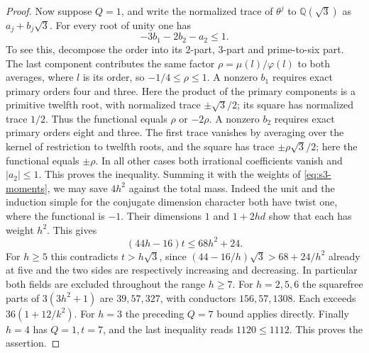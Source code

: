 \documentclass[11pt,a4paper]{article}
\numberwithin{equation}{section}
\begin{document}
\begin{proof}
Now suppose $Q=1$, and write the normalized trace of $\theta^j$
to $\mathbb Q(\sqrt3)$ as $a_j+b_j\sqrt3$.
For every root of unity one has
\[
 -3b_1-2b_2-a_2\le1.
\]
To see this, decompose the order into its $2$-part, $3$-part and
prime-to-six part. The last component contributes the same factor
$\rho=\mu(l)/\varphi(l)$ to both averages, where $l$ is its order,
so $-1/4\le\rho\le1$. A nonzero $b_1$ requires exact primary
orders four and three. Here the product of the primary components
is a primitive twelfth root, with normalized trace $\pm\sqrt3/2$;
its square has normalized trace $1/2$. Thus the functional equals
$\rho$ or $-2\rho$. A nonzero $b_2$ requires exact primary orders
eight and three. The first trace vanishes by averaging over the
kernel of restriction to twelfth roots, and the square has trace
$\pm\rho\sqrt3/2$; here the functional equals $\pm\rho$.
In all other cases both irrational coefficients vanish and
$|a_2|\le1$. This proves the inequality. Summing it with the weights
of \eqref{eq:s3-moments}, we may save $4h^2$ against the total mass. Indeed the unit and the induction simple for the conjugate dimension character both have twist one, where the functional is $-1$. Their dimensions $1$ and $1+2hd$ show that each has weight $h^2$. This gives
\[
 (44h-16)t\le68h^2+24 .
\]
For $h\ge5$ this contradicts $t>h\sqrt3$, since
$(44-16/h)\sqrt3>68+24/h^2$ already at five and the two sides
are respectively increasing and decreasing. In particular both fields
are excluded throughout the range $h\ge7$. For $h=2,5,6$ the squarefree
parts of $3(3h^2+1)$ are $39,57,327$, with conductors $156,57,1308$.
Each exceeds $36(1+12/k^2)$. For $h=3$ the preceding $Q=7$ bound
applies directly. Finally $h=4$ has $Q=1,t=7$, and the last inequality
reads $1120\le1112$. This proves the assertion.
\end{proof}



\end{document}

